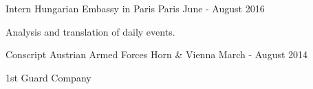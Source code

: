 \begin{cventries}
  \cventry
    {Intern} %
    {Hungarian Embassy in Paris} %
    {Paris} %
    {June - August 2016} %
    {
    \begin{cvitems}
    \item{Analysis and translation of daily events.}
    \end{cvitems}
    }

  \cventry
    {Conscript} %
    {Austrian Armed Forces} %
    {Horn \& Vienna} %
    {March - August 2014} %
    {
    \begin{cvitems}
    \item{1st Guard Company}
    \end{cvitems}
    }
        
\end{cventries}
